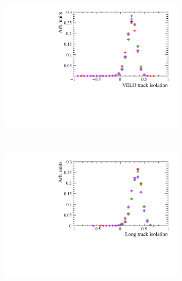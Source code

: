 \begin{figure}
 \begin{subfigure}[b]{0.48\textwidth}
        \includegraphics[width=\textwidth]{./Figs/Selection/bkgnd_iso_velo.pdf}
        \caption{ }
        \label{fig:BDTsig}
    \end{subfigure}
    ~ %
    \begin{subfigure}[b]{0.48\textwidth}
       \includegraphics[width=\textwidth]{./Figs/Selection/bkgnd_long_iso.pdf}
        \caption{ }
        \label{fig:BDTbkg}
    \end{subfigure}





\end{figure}
